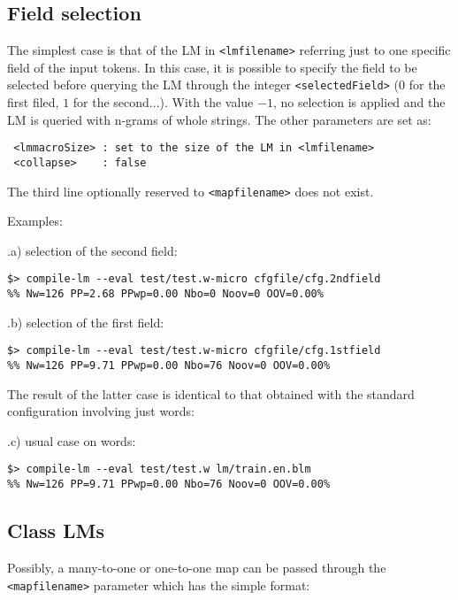 \documentclass[11pt]{article}
\begin{document}
\subsection{Field selection}

The simplest case is that of the LM in {\tt <lmfilename>} referring just to
one specific field of the input tokens. In this case, it is possible to
specify the field to be selected before querying the LM through the integer
{\tt <selectedField>} ($0$ for the first filed, $1$ for the
second...). With the value $-1$, no selection is applied and the LM is
queried with n-grams of whole strings.  The other parameters are set as:

\begin{verbatim}
 <lmmacroSize> : set to the size of the LM in <lmfilename>
 <collapse>    : false
\end{verbatim}

\noindent The third line optionally reserved to {\tt <mapfilename>} does not exist.

\bigskip
\noindent
Examples:

\bigskip
\noindent
\thesubsection.a) selection of the second field:
\begin{verbatim}
$> compile-lm --eval test/test.w-micro cfgfile/cfg.2ndfield
%% Nw=126 PP=2.68 PPwp=0.00 Nbo=0 Noov=0 OOV=0.00%
\end{verbatim}

\noindent
\thesubsection.b) selection of the first field:
\begin{verbatim}
$> compile-lm --eval test/test.w-micro cfgfile/cfg.1stfield
%% Nw=126 PP=9.71 PPwp=0.00 Nbo=76 Noov=0 OOV=0.00%
\end{verbatim}

\noindent The result of the latter case is identical to that obtained with
the standard configuration involving just words:

\bigskip
\noindent
\thesubsection.c) usual case on words:
\begin{verbatim}
$> compile-lm --eval test/test.w lm/train.en.blm 
%% Nw=126 PP=9.71 PPwp=0.00 Nbo=76 Noov=0 OOV=0.00%
\end{verbatim}


\subsection{Class LMs}

Possibly, a many-to-one or one-to-one map can be passed through the
{\tt <mapfilename>} parameter which has the simple format:
\end{document}
